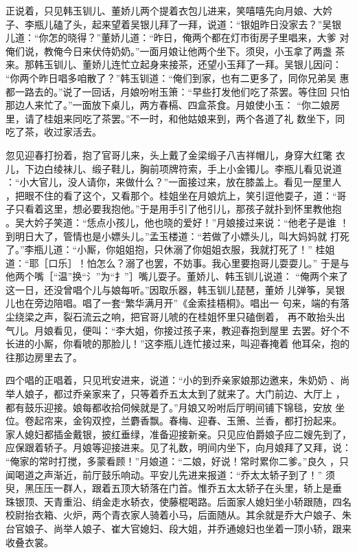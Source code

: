 正说着，只见韩玉钏儿、董娇儿两个提着衣包儿进来，笑嘻嘻先向月娘、大妗
子、李瓶儿磕了头，起来望着吴银儿拜了一拜，说道：“银姐昨日没家去？”吴银
儿道：“你怎的晓得？”董娇儿道：“昨日，俺两个都在灯市街房子里唱来，大爹
对俺们说，教俺今日来伏侍奶奶。”一面月娘让他两个坐下。须臾，小玉拿了两盏
茶来。那韩玉钏儿、董娇儿连忙立起身来接茶，还望小玉拜了一拜。吴银儿因问：
“你两个昨日唱多咱散了？”韩玉钏道：“俺们到家，也有二更多了，同你兄弟吴
惠都一路去的。”说了一回话，月娘吩咐玉箫：“早些打发他们吃了茶罢。等住回
只怕那边人来忙了。”一面放下桌儿，两方春槅、四盒茶食。月娘使小玉：
“你二娘房里，请了桂姐来同吃了茶罢。”不一时，和他姑娘来到，两个各道了礼
数坐下，同吃了茶，收过家活去。

忽见迎春打扮着，抱了官哥儿来，头上戴了金梁缎子八吉祥帽儿，身穿大红氅
衣儿，下边白绫袜儿、缎子鞋儿，胸前项牌符索，手上小金镯儿。李瓶儿看见说道
：“小大官儿，没人请你，来做什么？”一面接过来，放在膝盖上。看见一屋里人
，把眼不住的看了这个，又看那个。桂姐坐在月娘炕上，笑引逗他耍子，道：“哥
子只看着这里，想必要我抱他。”于是用手引了他引儿，那孩子就扑到怀里教他抱
。吴大妗子笑道：“恁点小孩儿，他也晓的爱好！”月娘接过来说：“他老子是谁
！到明日大了，管情也是小嫖头儿。”孟玉楼道：“若做了小嫖头儿，叫大妈妈就
打死了。”李瓶儿道：“小厮，你姐姐抱，只休溺了你姐姐衣服，我就打死了！”
桂姐道：“耶［口乐］！怕怎么？溺了也罢，不妨事。我心里要抱哥儿耍耍儿。”
于是与他两个嘴［“温”换“氵”为“扌”］嘴儿耍子。董娇儿、韩玉钏儿说道：
“俺两个来了这一日，还没曾唱个儿与娘每听。”因取乐器，韩玉钏儿琵琶，董娇
儿弹筝，吴银儿也在旁边陪唱。唱了一套“繁华满月开”《金索挂梧桐》。唱出一
句来，端的有落尘绕梁之声，裂石流云之响，把官哥儿唬的在桂姐怀里只磕倒着，
再不敢抬头出气儿。月娘看见，便叫：“李大姐，你接过孩子来，教迎春抱到屋里
去罢。好个不长进的小厮，你看唬的那脸儿！”这李瓶儿连忙接过来，叫迎春掩着
他耳朵，抱的往那边房里去了。

四个唱的正唱着，只见玳安进来，说道：“小的到乔亲家娘那边邀来，朱奶奶
、尚举人娘子，都过乔亲家来了，只等着乔五太太到了就来了。大门前边、大厅上
，都有鼓乐迎接。娘每都收拾伺候就是了。”月娘又吩咐后厅明间铺下锦毯，安放
坐位。卷起帘来，金钩双控，兰麝香飘。春梅、迎春、玉箫、兰香，都打扮起来。
家人媳妇都插金戴银，披红垂绿，准备迎接新亲。只见应伯爵娘子应二嫂先到了，
应保跟着轿子。月娘等迎接进来。见了礼数，明间内坐下，向月娘拜了又拜，说：
“俺家的常时打搅，多蒙看顾！”月娘道：“二娘，好说！常时累你二爹。”良久
，只闻喝道之声渐近，前厅鼓乐响动。平安儿先进来报道：“乔太太轿子到了！”
须臾，黑压压一群人，跟着五顶大轿落在门首。惟乔五太太轿子在头里，轿上是垂
珠银顶、天青重沿、绡金走水轿衣，使藤棍喝路。后面家人媳妇坐小轿跟随，四名
校尉抬衣箱、火炉，两个青衣家人骑着小马，后面随从。其余就是乔大户娘子、朱
台官娘子、尚举人娘子、崔大官媳妇、段大姐，并乔通媳妇也坐着一顶小轿，跟来
收叠衣裳。

